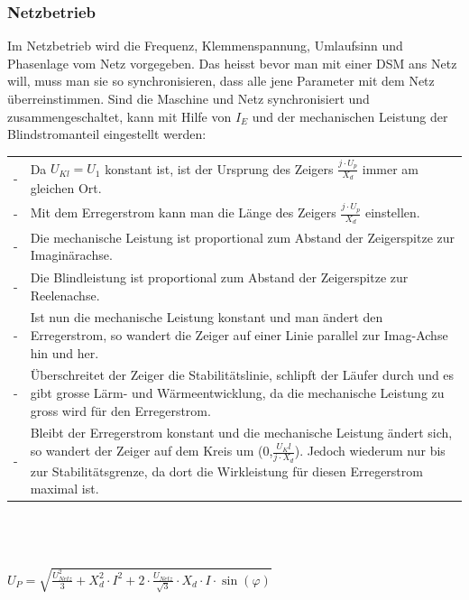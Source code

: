 		\subsubsection{Netzbetrieb}
			Im Netzbetrieb wird die Frequenz, Klemmenspannung, Umlaufsinn und Phasenlage
			vom Netz vorgegeben. Das heisst bevor man mit einer DSM ans Netz will, muss man sie so
			synchronisieren, dass alle jene Parameter mit dem Netz überreinstimmen.
			Sind die Maschine und Netz synchronisiert und zusammengeschaltet, kann mit
			Hilfe von $I_E$ und der mechanischen Leistung der Blindstromanteil
			eingestellt werden:\\
			\begin{minipage}{8.2cm}
            \end{minipage}
			\begin{minipage}{9.7cm}
            \begin{tabular}[c]{p{0.2cm} p{9.5cm}}
				-& Da $U_{Kl} = U_1$ konstant ist, ist der Ursprung des Zeigers $\frac{j
				\cdot U_p}{X_d}$ immer am gleichen Ort.\\ 
				-& Mit dem Erregerstrom kann man die Länge des Zeigers $\frac{j \cdot
				U_p}{X_d}$ einstellen.\\
				-& Die mechanische Leistung ist proportional zum Abstand der
				Zeigerspitze zur Imaginärachse. \\
				-& Die Blindleistung ist proportional zum Abstand  der
				Zeigerspitze zur Reelenachse.\\
				-& Ist nun die mechanische Leistung konstant und man ändert den
				Erregerstrom, so wandert die Zeiger auf einer Linie parallel zur Imag-Achse hin und her.\\
				-& Überschreitet der Zeiger die Stabilitätslinie, schlipft der Läufer durch
				und es gibt grosse Lärm- und Wärmeentwicklung, da die mechanische Leistung zu
				gross wird für den Erregerstrom.\\
				-& Bleibt der Erregerstrom konstant und die mechanische Leistung ändert
				sich, so wandert der Zeiger auf dem Kreis um (0,$\frac{U_Kl}{j \cdot X_d}$).
				Jedoch wiederum nur bis zur Stabilitätsgrenze, da dort die Wirkleistung für
				diesen Erregerstrom maximal ist.         
             \end{tabular}	
			 \end{minipage}\\
\\
			\\
			$U_P = \sqrt{\frac{U^2_{Netz}}{3} + X_d^2 \cdot I^2 + 2 \cdot
			\frac{U_{Netz}}{\sqrt{3}}\cdot X_d \cdot I \cdot \sin(\varphi)}$
	
